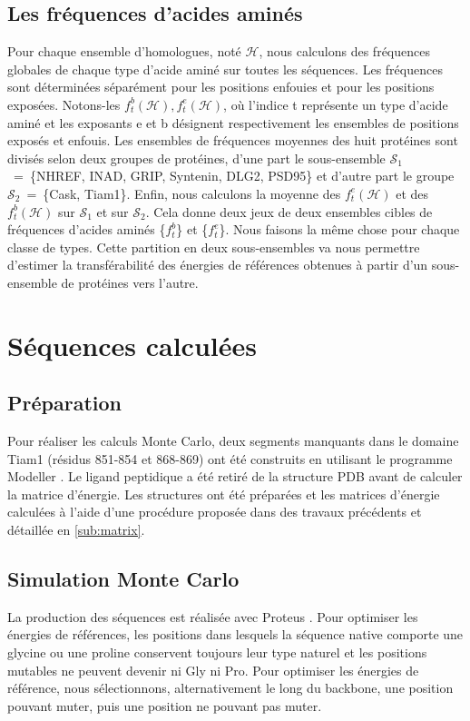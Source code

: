 \subsection{Les fréquences d'acides aminés}

Pour chaque ensemble d'homologues, noté $\mathcal{H}$, nous calculons des fréquences globales de chaque type d'acide aminé sur toutes les séquences. Les fréquences sont déterminées séparément pour les positions enfouies et pour les positions exposées. Notons-les ${f^b_t(\mathcal{H}), f^e_t(\mathcal{H})}$, où l'indice t représente un type d'acide aminé et les exposants e et b désignent respectivement les ensembles de positions exposés et enfouis. Les ensembles de fréquences moyennes des huit protéines sont divisés selon deux groupes de protéines, d'une part le sous-ensemble $\mathcal{S}_1$~=~\{NHREF, INAD, GRIP, Syntenin, DLG2, PSD95\} et d'autre part le groupe $\mathcal{S}_2$~=~\{Cask, Tiam1\}. Enfin, nous calculons la moyenne des $f^e_t(\mathcal{H})$ et des $f^b_t(\mathcal{H})$ sur $\mathcal{S}_1$ et sur $\mathcal{S}_2$. Cela donne deux jeux de deux ensembles cibles de fréquences d'acides aminés \{$f^b_t$\} et \{$f^e_t$\}. Nous faisons la même chose pour chaque classe de types. Cette partition en deux sous-ensembles va nous permettre d'estimer la transférabilité des énergies de références obtenues à partir d'un sous-ensemble de protéines vers l'autre.
\label{subsection:freqaa}
        



\section{Séquences calculées}

\subsection{Préparation}
Pour réaliser les calculs Monte Carlo, deux segments manquants dans le domaine Tiam1 (résidus 851-854 et 868-869) ont été construits en utilisant le programme Modeller \cite{Eswar06}. Le ligand peptidique a été retiré de la structure PDB avant de calculer la matrice d'énergie. Les structures ont été préparées et les matrices d'énergie calculées à l'aide d'une procédure proposée dans des travaux précédents \cite{Schmidt08b, Schmidt09} et détaillée en \ref{sub:matrix}. 
 

\subsection{Simulation Monte Carlo}    
La production des séquences est réalisée avec Proteus \cite{Simonson13b}. Pour optimiser les énergies de références, les positions dans lesquels la séquence native comporte une glycine ou une proline conservent toujours leur type naturel et les positions mutables ne peuvent devenir ni Gly ni Pro. Pour optimiser les énergies de référence, nous sélectionnons, alternativement le long du backbone, une position pouvant muter, puis une position ne pouvant pas muter.

